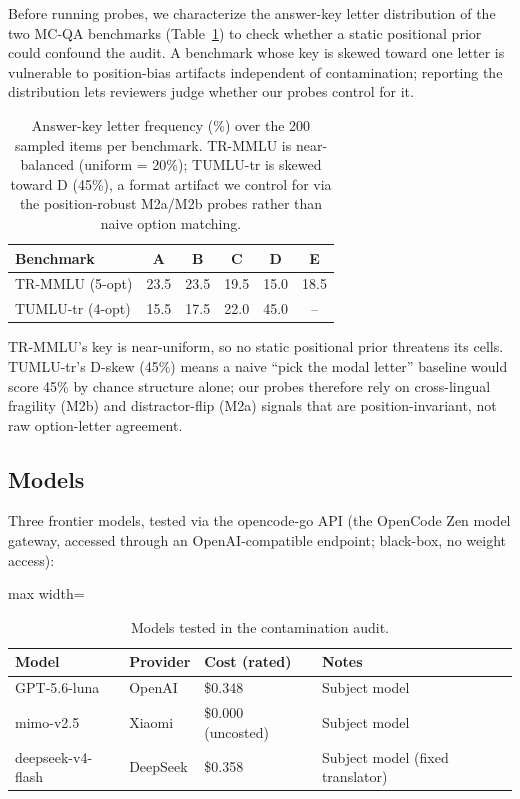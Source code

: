 \documentclass[11pt]{article}
\begin{document}
Before running probes, we characterize the answer-key letter distribution of the two MC-QA benchmarks (Table~\ref{tab:keyfreq}) to check whether a static positional prior could confound the audit. A benchmark whose key is skewed toward one letter is vulnerable to position-bias artifacts independent of contamination; reporting the distribution lets reviewers judge whether our probes control for it.

\begin{table}[t]
\centering
\small
\begin{tabular}{lccccc}
\toprule
\textbf{Benchmark} & \textbf{A} & \textbf{B} & \textbf{C} & \textbf{D} & \textbf{E} \\
\midrule
TR-MMLU (5-opt) & 23.5 & 23.5 & 19.5 & 15.0 & 18.5 \\
TUMLU-tr (4-opt) & 15.5 & 17.5 & 22.0 & 45.0 & -- \\
\bottomrule
\end{tabular}
\caption{Answer-key letter frequency (\%) over the 200 sampled items per benchmark. TR-MMLU is near-balanced (uniform = 20\%); TUMLU-tr is skewed toward D (45\%), a format artifact we control for via the position-robust M2a/M2b probes rather than naive option matching.}
\label{tab:keyfreq}
\end{table}

TR-MMLU's key is near-uniform, so no static positional prior threatens its cells. TUMLU-tr's D-skew (45\%) means a naive ``pick the modal letter'' baseline would score 45\% by chance structure alone; our probes therefore rely on cross-lingual fragility (M2b) and distractor-flip (M2a) signals that are position-invariant, not raw option-letter agreement.

\subsection{Models}

Three frontier models, tested via the opencode-go API (the OpenCode Zen model gateway, accessed through an OpenAI-compatible endpoint; black-box, no weight access):

\begin{table}[t]
\centering
\begin{adjustbox}{max width=\textwidth}
\begin{tabular}{llll}
\toprule
\textbf{Model} & \textbf{Provider} & \textbf{Cost (rated)} & \textbf{Notes} \\
\midrule
GPT-5.6-luna & OpenAI & \$0.348 & Subject model \\
mimo-v2.5 & Xiaomi & \$0.000 (uncosted) & Subject model \\
deepseek-v4-flash & DeepSeek & \$0.358 & Subject model (fixed translator) \\
\bottomrule
\end{tabular}%
\end{adjustbox}
\caption{Models tested in the contamination audit.}
\label{tab:models}
\end{table}
\end{document}
